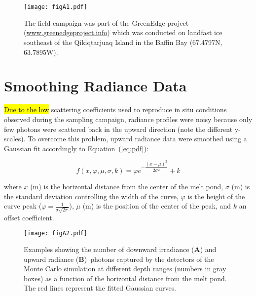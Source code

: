 \documentclass[applsci,article,accept,moreauthors,pdftex,10pt,a4paper]{Definitions/mdpi}
\begin{document}
\section{}\label{app}

\begin{figure}[H]
	\centering
	\texttt{[image: figA1.pdf]}
	\caption{The field campaign was part of the GreenEdge project (\url{www.greenedgeproject.info}) which was conducted on landfast ice southeast of the Qikiqtarjuaq Island in the Baffin Bay (67.4797N, 63.7895W).}\label{figA1}
\end{figure}



\section{Smoothing Radiance Data}

\hl{Due to the low} %
scattering coefficients used to reproduce in situ conditions observed during the sampling campaign, radiance profiles were noisy because only few photons were scattered back in the upward direction (note the different y-scales). To overcome this problem, upward radiance data were smoothed using a Gaussian fit accordingly to Equation~(\ref{eq:pdf}): 

\begin{equation}
	\label{eq:pdf}
	f(x,\varphi,\mu,\sigma, k) = \varphi e^{-\dfrac{(x-\mu)^2}{2 \sigma^2}} + k
\end{equation}

\noindent where $x$ (m) is the horizontal distance from the center of the melt pond, $\sigma$ (m) is the standard deviation controlling the width of the curve, $\varphi$ is the height of the curve peak ($\varphi = \frac{1}{\sigma\sqrt{2\pi}}$), $\mu$ (m) is the position of the center of the peak, and $k$ an offset coefficient.

\begin{figure}[H]
	\centering
	\texttt{[image: figA2.pdf]}
	\caption{Examples showing the number of downward irradiance (\textbf{A}) and upward radiance (\textbf{B})~photons captured by the detectors of the Monte Carlo simulation at different depth ranges (numbers in gray boxes) as a function of the horizontal distance from the melt pond. The red lines represent the fitted Gaussian curves.}\label{figA2}
\end{figure}
\end{document}
